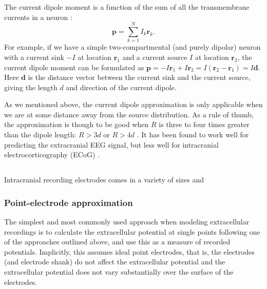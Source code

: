 The current dipole moment is a function of the sum of all the transmembrane currents in a neuron \citep{Pettersen2008, Pettersen2014, Nunez2006}: 
\begin{equation}\label{VC:eq:dipole}
\mathbf{p} = \sum_{k=1}^N I_k \mathbf{r}_k.
\end{equation}
For example, if we have a simple two-compartmental (and purely dipolar) neuron with a current sink $-I$ at location $\mathbf{r}_1$ and a current source $I$ at location $\mathbf{r}_2$, the current dipole moment can be formulated as $\mathbf{p} = -I\mathbf{r}_1 + I\mathbf{r}_2 = I(\mathbf{r}_2 - \mathbf{r}_1) = I\mathbf{d}$. Here $\mathbf{d}$ is the distance vector between the current sink and the current source, giving the length $d$ and direction of the current dipole. 

As we mentioned above, the current dipole approximation is only applicable when we are at some distance away from the source distribution. As a rule of thumb, the approximation is though to be good when $R$ is three to four times greater than the dipole length: $R > 3d$ or $R > 4d$ \citep{Nunez2006}. It has been found to work well for predicting the extracranial EEG signal, but less well for intracranial electrocorticography (ECoG) \citep{naess2020biophysical}.


\subsection{}
\label{sec:VC:electrodes}

Intracranial recording electrodes comes in a variety of sizes and 

\subsubsection{Point-electrode approximation}
The simplest and most commonly used approach when modeling extracellular recordings is to calculate the extracellular potential at single points following one of the approaches outlined above, and use this as a measure of recorded potentials. Implicitly, this assumes ideal point electrodes, that is, the electrodes (and electrode shank) do not affect the extracellular potential and the extracellular potential does not vary substantially over the surface of the electrodes.

